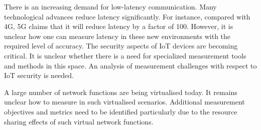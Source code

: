 There is an increasing demand for low-latency communication.  Many
technological advances reduce latency significantly. For instance, compared
with 4G, 5G claims that it will reduce latency by a factor of 100. However, it
is unclear how one can measure latency in these new environments with the
required level of accuracy. The security aspects of \ac{IoT} devices are
becoming critical. It is unclear whether there is a need for specialized
measurement tools and methods in this space. An analysis of measurement
challenges with respect to \ac{IoT} security is needed.


A large number of network functions are being virtualised today.  It remains
unclear how to measure in such virtualised scenarios. Additional measurement
objectives and metrics need to be identified particularly due to the resource
sharing effects of such virtual network functions.

